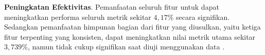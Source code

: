 \vspace{2mm}
\noindent\textbf{Peningkatan Efektivitas}. Pemanfaatan seluruh fitur untuk \reranking{} dapat meningkatkan performa seluruh metrik sekitar $4,17\%$ secara signifikan. Sedangkan pemanfaatan himpunan bagian dari fitur yang diusulkan, yaitu ketiga fitur terpenting yang konsisten, dapat meningkatkan nilai metrik utama sekitar $3, 739\%$, namun tidak cukup signifikan saat diuji menggunakan data \testing{}.





